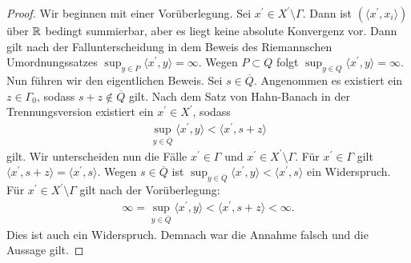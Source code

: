 \begin{proof}
	Wir beginnen mit einer Vorüberlegung.
	Sei $ x^\prime \in X^\prime \setminus \Gamma $.
	Dann ist $ (\langle x^\prime,x_i \rangle) $ über $ \mathbb{R} $ bedingt summierbar, aber es liegt keine absolute Konvergenz vor.
	Dann gilt nach der Fallunterscheidung in dem Beweis des Riemannschen Umordnungssatzes $ \sup_{y \in P} \langle x^\prime ,y \rangle = \infty $. 
	Wegen $ P \subset Q $ folgt $ \sup_{y \in Q} \langle x^\prime ,y \rangle = \infty $.\\
	Nun führen wir den eigentlichen Beweis.
	Sei $ s \in \overline{Q} $.
	Angenommen es existiert ein $ z \in \Gamma_0 $, sodass $ s + z \notin \overline{Q} $ gilt. Nach dem Satz von Hahn-Banach in der Trennungsversion \cite{Werner2011} existiert ein $ x^\prime \in X^\prime $, sodass
	\begin{align*}
		\sup \limits_{y \in \overline{Q}} \langle x^\prime ,y \rangle < \langle x^\prime , s+z \rangle
	\end{align*}
	gilt. 
	Wir unterscheiden nun die Fälle $ x^\prime \in \Gamma $ und $ x^\prime \in X^\prime \setminus \Gamma $.
	Für $ x^\prime \in \Gamma $ gilt $ \langle x^\prime, s + z \rangle = \langle x^\prime, s  \rangle $. Wegen $ s \in \overline{Q} $ ist
	$ \sup_{y \in \overline{Q}} \langle x^\prime ,y \rangle < \langle x^\prime , s \rangle $
	ein Widerspruch. Für $ x^\prime \in X^\prime \setminus \Gamma $ gilt nach der Vorüberlegung:
	\begin{align*}
		\infty =\sup \limits_{y \in \overline{Q}} \langle x^\prime ,y \rangle < \langle x^\prime , s+z \rangle < \infty.
	\end{align*}
	Dies ist auch ein Widerspruch.
	Demnach war die Annahme falsch und die Aussage gilt.
\end{proof}


